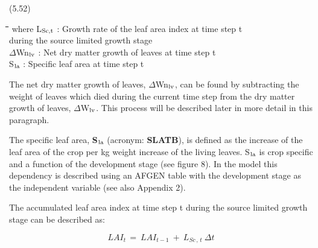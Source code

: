 \documentclass[11pt]{article}
\begin{document}
 \bigskip
\strut\hfill (5.52)
\nwln
\begin{tabbing}
\hspace{1.27cm}\=\hspace{1.27cm}\=\hspace{1.27cm}\=\hspace{1.27cm}\=%
\hspace{1.27cm}\=\hspace{1.27cm}\=\hspace{1.27cm}\=\hspace{1.27cm}\=%
\hspace{1.27cm}\=\hspace{1.27cm}\=\kill
where\> L$_{{\rm Sc,t}}$\> : Growth rate of the leaf area index at time step t\\
\>\>   during the source limited growth stage \> \> \> \> \> \> \> \> [ha ha$^{{\rm -1}}$ d$^{{\rm -1}}$]\\
\>$\Delta$Wn$_{{\rm lv}}$\> : Net dry matter growth of leaves at time step t\> \> \> \> \> \> \> \> [kg ha$^{{\rm -1}}$ d$^{{\rm -1}}$]\\
\>S$_{{\rm la}}$\> : Specific leaf area at time step t\> \> \> \> \> \> \> \> [ha kg$^{{\rm -1}}$]
\end{tabbing}

 \bigskip
The net dry matter growth of leaves, $\Delta$Wn$_{{\rm lv}}$, can be found by subtracting the weight of
leaves which died during the current time step from the dry matter growth of leaves,
$\Delta$W$_{{\rm lv}}$. This process will be described later in more detail in this paragraph.

\bigskip
The specific leaf area, {\bf S$_{{\rm la}}$} (acronym: {\bf SLATB}), is defined as the increase of the leaf area
of the crop per kg weight increase of the living leaves. S$_{{\rm la}}$ is crop specific and a function
of the development stage (see figure 8). In the model this dependency is described using
an AFGEN table with the development stage as the independent variable (see also
Appendix 2).

\bigskip
\bigskip
 The accumulated leaf area index at time step t during the source limited growth stage can
be described as:

\begin{displaymath}
LAI _{t~} =~LAI _{t-1} ~+~L _{Sc\, ,\, t} ~\Delta t
\end{displaymath}
\end{document}
